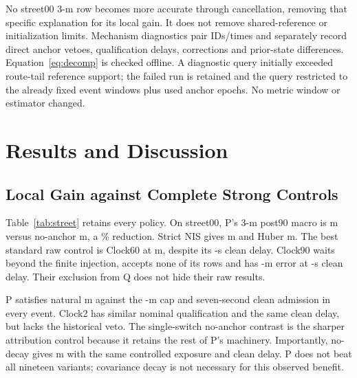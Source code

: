 \documentclass[conference]{IEEEtran}
\begin{document}
No street00 3-m row becomes more accurate through cancellation, removing that specific explanation for its local gain. It does not remove shared-reference or initialization limits. Mechanism diagnostics pair IDs/times and separately record direct anchor vetoes, qualification delays, corrections and prior-state differences. Equation~\eqref{eq:decomp} is checked offline. A diagnostic query initially exceeded route-tail reference support; the failed run is retained and the query restricted to the already fixed event windows plus used anchor epochs. No metric window or estimator changed.

\section{Results and Discussion}
\subsection{Local Gain against Complete Strong Controls}
Table~\ref{tab:street} retains every policy. On street00, P's 3-m post90 macro is  m versus no-anchor  m, a \% reduction. Strict NIS gives  m and Huber  m. The best standard raw control is Clock60 at  m, despite its -s clean delay. Clock90 waits beyond the finite injection, accepts none of its rows and has -m error at -s clean delay. Their exclusion from Q does not hide their raw results.

\begin{table}[t]
\caption{street00 controlled 3-m results, all 19 fixed policies. $R_{90}/R_{180}$: event-macro horizontal RMSE (m). $T_c$: maximum actual clean admission (s); C180 is censored. $n_b$: accepted injected rows out of 270. Q combines natural cost, clean service and coverage.}\label{tab:street}
\centering\small\setlength{\tabcolsep}{3pt}

\end{table}

P satisfies natural  m against the -m cap and seven-second clean admission in every event. Clock2 has similar nominal qualification and the same clean delay, but lacks the historical veto. The single-switch no-anchor contrast is the sharper attribution control because it retains the rest of P's machinery. Importantly, no-decay gives  m with the same controlled exposure and clean delay. P does not beat all nineteen variants; covariance decay is not necessary for this observed benefit.
\end{document}
